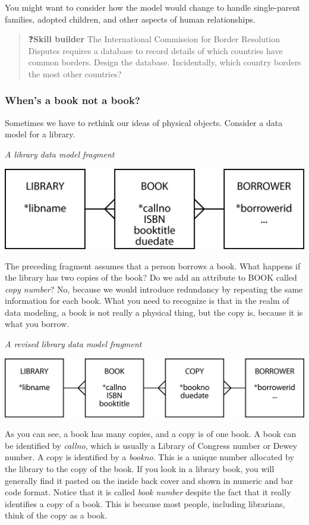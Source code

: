 \documentclass[
]{article}
\begin{document}
You might want to consider how the model would change to handle
single-parent families, adopted children, and other aspects of human
relationships.

\begin{quote}
❓\textbf{Skill builder} The International Commission for Border Resolution
Disputes requires a database to record details of which countries have
common borders. Design the database. Incidentally, which country
borders the most other countries?
\end{quote}

\hypertarget{whens-a-book-not-a-book}{%
\subsubsection*{When's a book not a book?}\label{whens-a-book-not-a-book}}

Sometimes we have to rethink our ideas of physical objects. Consider a
data model for a library.

\emph{A library data model fragment}

\includegraphics{Figures/Chapter 7/library-1.png}

The preceding fragment assumes that a person borrows a book. What
happens if the library has two copies of the book? Do we add an
attribute to BOOK called \emph{copy number}? No, because we would introduce
redundancy by repeating the same information for each book. What you
need to recognize is that in the realm of data modeling, a book is not
really a physical thing, but the copy is, because it is what you borrow.

\emph{A revised library data model fragment}

\includegraphics{Figures/Chapter 7/library-2.png}

As you can see, a book has many copies, and a copy is of one book. A
book can be identified by \emph{callno}, which is usually a Library of
Congress number or Dewey number. A copy is identified by a \emph{bookno}.
This is a unique number allocated by the library to the copy of the
book. If you look in a library book, you will generally find it pasted
on the inside back cover and shown in numeric and bar code format.
Notice that it is called \emph{book number} despite the fact that it really
identifies a copy of a book. This is because most people, including
librarians, think of the copy as a book.
\end{document}
